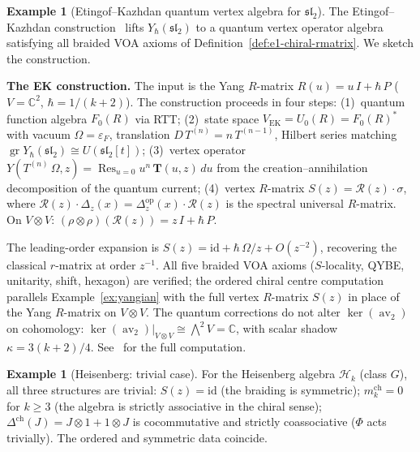 \documentclass[11pt,reqno]{amsart}
\theoremstyle{definition}
\newtheorem{example}[theorem]{Example}
\theoremstyle{remark}
\newcommand{\cH}{\mathcal{H}}
\DeclareMathOperator{\Res}{Res}
\DeclareMathOperator{\av}{av}
\newcommand{\CC}{\mathbb{C}}
\newcommand{\id}{\mathrm{id}}
\numberwithin{equation}{section}
\begin{document}
\begin{example}[Etingof--Kazhdan quantum vertex algebra for
$\mathfrak{sl}_2$]
\label{ex:ek-qvoa}
The Etingof--Kazhdan construction~\cite{EK00} lifts
$Y_\hbar(\mathfrak{sl}_2)$ to a quantum vertex operator
algebra satisfying all braided VOA axioms of
Definition~\ref{def:e1-chiral-rmatrix}. We sketch the
construction.

\smallskip
\noindent
\textbf{The EK construction.}
The input is the Yang $R$-matrix
$R(u) = u\,I + \hbar\,P$ ($V = \CC^2$, $\hbar = 1/(k{+}2)$).
The construction proceeds in four steps:
(1)~quantum function algebra $F_0(R)$ via RTT;
(2)~state space $V_{\mathrm{EK}} = U_0(R) = F_0(R)^*$
with vacuum $\Omega = \varepsilon_F$, translation
$D\,T^{(n)} = n\,T^{(n-1)}$, Hilbert series matching
$\operatorname{gr} Y_\hbar(\mathfrak{sl}_2) \cong
U(\mathfrak{sl}_2[t])$;
(3)~vertex operator $Y(T^{(n)}\,\Omega, z)
= \Res_{u=0} u^n\,\mathbf{T}(u,z)\,du$
from the creation--annihilation decomposition of the
quantum current;
(4)~vertex $R$-matrix
$S(z) = \mathcal{R}(z) \cdot \sigma$, where
$\mathcal{R}(z) \cdot \Delta_z(x)
= \Delta_z^{\mathrm{op}}(x) \cdot \mathcal{R}(z)$
is the spectral universal $R$-matrix.
On $V \otimes V$: $(\rho \otimes \rho)(\mathcal{R}(z))
= z\,I + \hbar\,P$.

The leading-order expansion is
$S(z) = \id + \hbar\,\Omega/z + O(z^{-2})$,
recovering the classical $r$-matrix at order $z^{-1}$.
All five braided VOA axioms ($S$-locality, QYBE, unitarity,
shift, hexagon) are verified; the ordered chiral centre
computation parallels Example~\ref{ex:yangian} with the
full vertex $R$-matrix $S(z)$ in place of the Yang
$R$-matrix on $V \otimes V$. The quantum corrections do not
alter $\ker(\av_2)$ on cohomology: $\ker(\av_2)|_{V \otimes V}
\cong \bigwedge^2 V = \CC$, with scalar shadow
$\kappa = 3(k{+}2)/4$.
See~\cite[\S III.3]{Lorgat26I} for the full computation.
\end{example}

\begin{example}[Heisenberg: trivial case]
\label{ex:heis-coproduct}
For the Heisenberg algebra $\cH_k$ (class $G$), all three
structures are trivial:
$S(z) = \id$ (the braiding is symmetric);
$m_k^{\mathrm{ch}} = 0$ for $k \geq 3$ (the algebra is
strictly associative in the chiral sense);
$\Delta^{\mathrm{ch}}(J) = J \otimes 1 + 1 \otimes J$ is
cocommutative and strictly coassociative ($\Phi$ acts
trivially). The ordered and symmetric data coincide.
\end{example}
\end{document}
